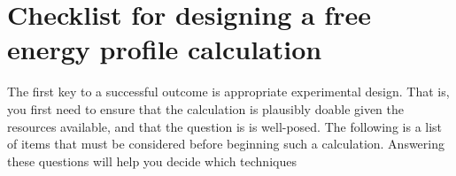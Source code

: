 
\section{Checklist for designing a free energy profile calculation}


The first key to a successful outcome is appropriate experimental design.  That is, you first need to ensure that the calculation is plausibly doable given the resources available, and that the question is is well-posed.  The following is a list of items that must be considered before beginning such a calculation.  Answering these questions will help you decide which techniques

